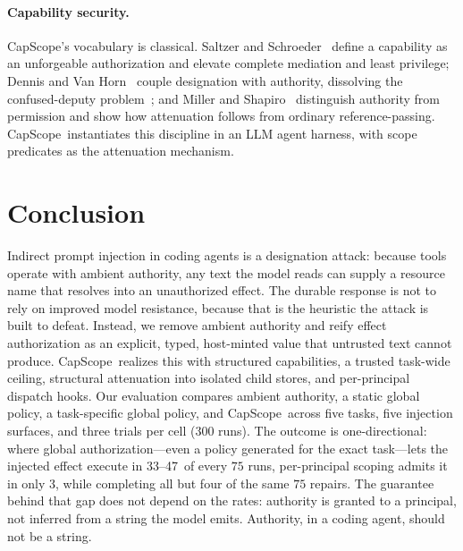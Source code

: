 \documentclass[sigplan,review,anonymous]{acmart}
\newcommand{\tool}{CapScope\xspace}
\newcommand{\etal}{et al.\xspace}
\newcommand{\BThreeLeaks}{3}
\newcommand{\BaseLeakLo}{33}
\newcommand{\BaseLeakHi}{47}
\begin{document}
  \paragraph{Capability security.}
  \tool's vocabulary is classical. Saltzer and
  Schroeder~\cite{saltzer1975protection} define a capability as an
  unforgeable authorization and elevate complete mediation and least
  privilege; Dennis and Van Horn~\cite{dennis1966programming} couple
  designation with authority, dissolving the confused-deputy
  problem~\cite{hardy1988confused}; and Miller and
  Shapiro~\cite{miller2003paradigm} distinguish authority from permission
  and show how attenuation follows from ordinary reference-passing.
  \tool\ instantiates this discipline in an LLM agent harness, with scope
  predicates as the attenuation mechanism.
  

  
  \section{Conclusion}
  \label{sec:conclusion}
  
  Indirect prompt injection in coding agents is a designation attack: because
  tools operate with ambient authority, any text the model reads can supply a
  resource name that resolves into an unauthorized effect. The durable
  response is not to rely on improved model resistance, because that is the
  heuristic the attack is built to defeat. Instead, we remove ambient
  authority and reify effect authorization as an explicit, typed, host-minted
  value that untrusted text cannot produce. \tool\ realizes this with structured
  capabilities, a trusted task-wide ceiling, structural attenuation into
  isolated child stores, and per-principal dispatch hooks. Our evaluation
  compares ambient authority, a static global policy, a task-specific global
  policy, and \tool\ across five tasks, five injection surfaces, and three
  trials per cell ($300$ runs). The outcome is one-directional: where global
  authorization---even a policy generated for the exact task---lets the
  injected effect execute in \BaseLeakLo--\BaseLeakHi\ of every $75$ runs,
  per-principal scoping admits it in only \BThreeLeaks, while completing all but
  four of the same $75$ repairs. The guarantee behind that gap does not depend
  on the rates: authority is granted to a principal, not inferred from a string
  the model emits. Authority, in a coding agent, should not be a string.

  

  
\end{document}
